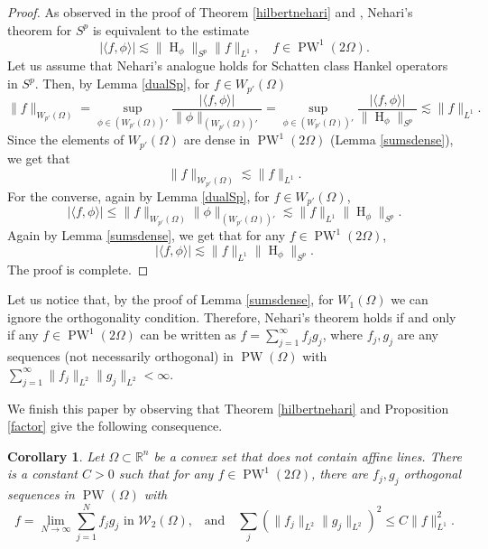 \documentclass{amsart}
\theoremstyle{plain}
\newtheorem{cor}[theo]{Corollary}
\DeclareMathOperator{\Ha}{H}
\DeclareMathOperator{\PW}{PW}
\begin{document}
\begin{proof}
	As observed in the proof of Theorem \ref{hilbertnehari} and \cite[Lemma 2.1]{bampouras2026nehari}, Nehari's theorem for $S^p$ is equivalent to the estimate
	$$|\langle f,\phi\rangle|\lesssim \|\Ha_\phi\|_{S^p}\|f\|_{L^1},\quad f\in\PW^1(2\Omega).$$
	Let us assume that Nehari's analogue holds for Schatten class Hankel operators in $S^p$. Then, by Lemma \ref{dualSp}, for $f\in W_{p'}(\Omega)$
	$$\|f\|_{W_{p'}(\Omega)}=\sup_{\phi\in (W_{p'}(\Omega))'}\frac{|\langle f,\phi\rangle|}{\|\phi\|_{(W_{p'}(\Omega))'}}=\sup_{\phi\in (W_{p'}(\Omega))'}\frac{|\langle f,\phi\rangle|}{\|\Ha_\phi\|_{S^p}}\lesssim \|f\|_{L^1}.$$
	Since the elements of $W_{p'}(\Omega)$ are dense in $\PW^1(2\Omega)$ (Lemma \ref{sumsdense}), we get that
	$$\|f\|_{\mathcal{W}_{p'}(\Omega)}\lesssim  \|f\|_{L^1}.$$
	For the converse, again by Lemma \ref{dualSp}, for $f\in W_{p'}(\Omega)$,
	$$|\langle f,\phi\rangle|\leq \|f\|_{W_{p'}(\Omega)}\|\phi\|_{(W_{p'}(\Omega))'}\lesssim \|f\|_{L^1}\|\Ha_\phi\|_{S^p}.$$ Again by Lemma \ref{sumsdense}, we get that for any $f\in \PW^1(2\Omega)$,
	$$|\langle f,\phi\rangle|\lesssim \|f\|_{L^1}\|\Ha_\phi\|_{S^p}.$$
	The proof is complete.
\end{proof}
Let us notice that, by the proof of Lemma \ref{sumsdense}, for $W_1(\Omega)$ we can ignore the orthogonality condition. Therefore, Nehari's theorem holds if and only if any $f\in \PW^1(2\Omega)$ can be written as $f=\sum_{j=1}^\infty f_j g_j$, where $f_j,g_j$ are any sequences (not necessarily orthogonal) in $\PW(\Omega)$ with $\sum_{j=1}^\infty \|f_j\|_{L^2}\|g_j\|_{L^2}<\infty.$


We finish this paper by observing that Theorem \ref{hilbertnehari} and Proposition \ref{factor} give the following consequence.
\begin{cor}
	Let $\Omega\subset\mathbb{R}^n$ be a convex set that does not contain affine lines. There is a constant $C>0$ such that for any $f\in \PW^1(2\Omega)$, there are $f_j,g_j$ orthogonal sequences in $\PW(\Omega)$ with
	$$f=\lim_{N\to \infty} \sum_{j=1}^N f_j g_j \text{ in $\mathcal{W}_2(\Omega)$,} \quad  \text{and}\quad  \sum_j (\|f_j\|_{L^2}\|g_j\|_{L^2})^2\leq C\|f\|_{L^1}^2.$$
\end{cor}

	
	
	
	
\end{document}

